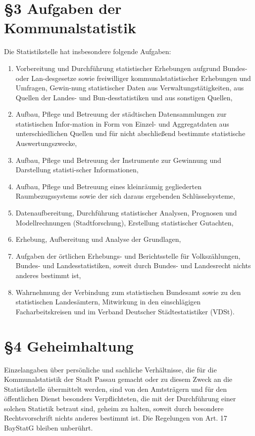  \section{\S3 Aufgaben der Kommunalstatistik}
 Die Statistikstelle hat insbesondere folgende Aufgaben:
  \begin{enumerate}[label=\arabic*.]
    \item Vorbereitung und Durchführung statistischer Erhebungen aufgrund Bundes- oder Lan-desgesetze sowie freiwilliger kommunalstatistischer Erhebungen und Umfragen, Gewin-nung statistischer Daten aus Verwaltungstätigkeiten, aus Quellen der Landes- und Bun-desstatistiken und aus sonstigen Quellen, 
    \item Aufbau, Pflege und Betreuung der städtischen Datensammlungen zur statistischen Infor-mation in Form von Einzel- und Aggregatdaten aus unterschiedlichen Quellen und für nicht abschließend bestimmte statistische Auswertungszwecke, 
    \item Aufbau, Pflege und Betreuung der Instrumente zur Gewinnung und Darstellung statisti-scher Informationen,
    \item Aufbau, Pflege und Betreuung eines kleinräumig gegliederten Raumbezugssystems sowie der sich daraus ergebenden Schlüsselsysteme,
    \item Datenaufbereitung, Durchführung statistischer Analysen, Prognosen und Mo\-dell\-rech\-nun\-gen (Stadtforschung), Erstellung statistischer Gutachten, 
    \item Erhebung, Aufbereitung und Analyse der Grundlagen, 
    \item Aufgaben der örtlichen Erhebungs- und Berichtsstelle für Volkszählungen, Bundes- und Landesstatistiken, soweit durch Bundes- und Landesrecht nichts anderes bestimmt ist,
    \item Wahrnehmung der Verbindung zum statistischen Bundesamt sowie zu den statistischen Landesämtern, Mitwirkung in den einschlägigen Facharbeitskreisen und im Verband Deutscher Städtestatistiker (VDSt).
  \end{enumerate} 
  \section{\S4 Geheimhaltung}
    Einzelangaben über persönliche und sachliche Verhältnisse, die für die Kommunalstatistik der Stadt Passau gemacht oder zu diesem Zweck an die Statistikstelle übermittelt werden, sind von den Amtsträgern und für den öffentlichen Dienst besonders Verpflichteten, die mit der Durchführung einer solchen Statistik betraut sind, geheim zu halten, soweit durch besondere Rechtsvorschrift nichts anderes bestimmt ist. Die Regelungen von Art. 17 BayStatG bleiben unberührt.
    
